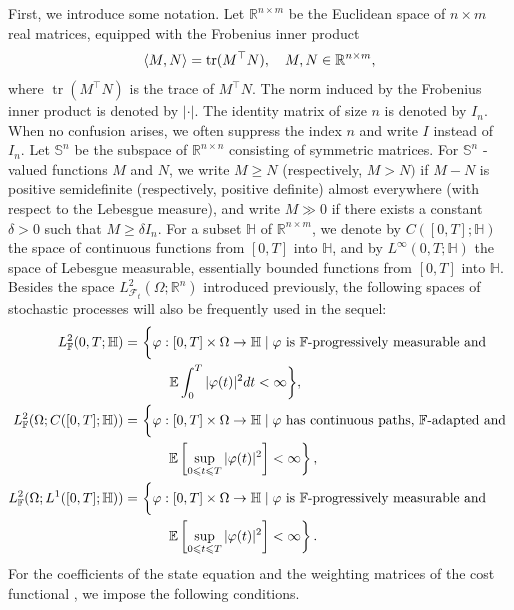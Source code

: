 \documentclass[11pt,times,twoside]{article}
\def\dbE{\mathbb{E}} \def\sE{\mathscr{E}} \def\fE{\mathfrak{E}} \def\cE{{\cal E}} \def\BE{{\bf E}} \def\Be{{\bf e}}
\def\dbF{\mathbb{F}} \def\sF{\mathscr{F}} \def\fF{\mathfrak{F}} \def\cF{{\cal F}} \def\BF{{\bf F}} \def\Bf{{\bf f}}
\def\nn{\nonumber}        \def\La{\mathop{\Leftarrow}}       \def\ran{\rangle}
\begin{document}
First, we introduce some notation. Let $\mathbb{R}^{n \times m}$ be the Euclidean space of $n \times m$ real matrices, equipped with the Frobenius inner product
$$
\lan M, N\ran=\operatorname{tr}(M^{\top} N), \quad M, N \in \mathbb{R}^{n \times m},
$$
where $\operatorname{tr}\left(M^{\top} N\right)$ is the trace of $M^{\top} N$. The norm induced by the Frobenius inner product is denoted by $|\cdot| .$ The identity matrix of size $n$ is denoted by $I_{n} .$ When no confusion arises, we often suppress the index $n$ and write $I$ instead of $I_{n} .$ Let $\mathbb{S}^{n}$ be the subspace of $\mathbb{R}^{n \times n}$ consisting of symmetric matrices. For $\mathbb{S}^{n}$ -valued functions $M$ and $N$, we write $M \geqslant N$ (respectively, $M>N)$ if $M-N$ is positive semidefinite (respectively, positive definite) almost everywhere (with respect to the Lebesgue measure), and write $M \gg 0$ if there exists a constant $\delta>0$ such that $M \geqslant \delta I_{n}$. For a subset $\mathbb{H}$ of $\mathbb{R}^{n \times m}$, we denote by $C([0, T] ; \mathbb{H})$ the space of continuous functions from $[0, T]$ into $\mathbb{H}$, and by $L^{\infty}(0, T ; \mathbb{H})$ the space of Lebesgue measurable, essentially bounded functions from $[0, T]$ into $\mathbb{H}$. Besides the space $L_{\mathcal{F}_{t}}^{2}\left(\Omega ; \mathbb{R}^{n}\right)$ introduced previously, the following spaces of stochastic processes will also be frequently used in the sequel:
%
\begin{align*}
L_{\mathbb{F}}^{2}(0,T;\mathbb{H})=&\ \bigg\{\varphi:[0, T] \times \Omega \rightarrow \mathbb{H} \mid \varphi \text { is $\dbF$-progressively measurable and } \nn \\
%
&\qq\ \dbE  \int_{0}^{T}|\varphi(t)|^{2} d t<\infty\bigg\}, \nn \\
%
L_{\dbF}^{2}(\Omega ; C([0, T] ; \mathbb{H}))=&\ \bigg\{\varphi:[0, T] \times \Omega \rightarrow \mathbb{H} \mid \varphi \text { has continuous paths, $\dbF$-adapted and }\nn  \\
%
&\qq \left. \dbE \left[\sup _{0 \leqslant t \leqslant T}|\varphi(t)|^{2}\right]<\infty\right\} ,\nn \\
%
%
L_{\dbF}^{2}(\Omega ; L^1([0, T] ; \mathbb{H}))=&\ \bigg\{\varphi:[0, T] \times \Omega \rightarrow \mathbb{H} \mid \varphi \text { is $\dbF$-progressively measurable and } \nn \\
%
&\qq \left. \dbE \left[\sup _{0 \leqslant t \leqslant T}|\varphi(t)|^{2}\right]<\infty\right\}. \nn
%
\end{align*}
%
For the coefficients of the state equation  and the weighting matrices of the cost functional , we impose the following conditions.
\end{document}
